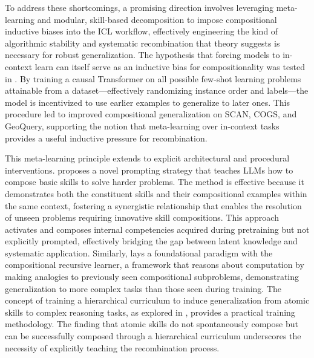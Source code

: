 \documentclass[11pt]{article}
\begin{document}
To address these shortcomings, a promising direction involves leveraging meta-learning and modular, skill-based decomposition to impose compositional inductive biases into the ICL workflow, effectively engineering the kind of algorithmic stability and systematic recombination that theory suggests is necessary for robust generalization. The hypothesis that forcing models to in-context learn can itself serve as an inductive bias for compositionality was tested in \cite{ref609}. By training a causal Transformer on all possible few-shot learning problems attainable from a dataset---effectively randomizing instance order and labels---the model is incentivized to use earlier examples to generalize to later ones. This procedure led to improved compositional generalization on SCAN, COGS, and GeoQuery, supporting the notion that meta-learning over in-context tasks provides a useful inductive pressure for recombination.

This meta-learning principle extends to explicit architectural and procedural interventions. \cite{ref610} proposes a novel prompting strategy that teaches LLMs how to compose basic skills to solve harder problems. The method is effective because it demonstrates both the constituent skills and their compositional examples within the same context, fostering a synergistic relationship that enables the resolution of unseen problems requiring innovative skill compositions. This approach activates and composes internal competencies acquired during pretraining but not explicitly prompted, effectively bridging the gap between latent knowledge and systematic application. Similarly, \cite{ref611} lays a foundational paradigm with the compositional recursive learner, a framework that reasons about computation by making analogies to previously seen compositional subproblems, demonstrating generalization to more complex tasks than those seen during training. The concept of training a hierarchical curriculum to induce generalization from atomic skills to complex reasoning tasks, as explored in \cite{ref612}, provides a practical training methodology. The finding that atomic skills do not spontaneously compose but can be successfully composed through a hierarchical curriculum underscores the necessity of explicitly teaching the recombination process.
\end{document}
